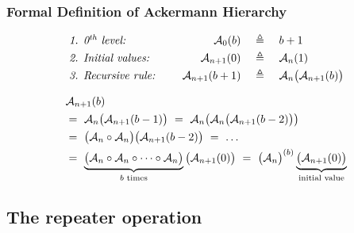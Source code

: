 \begin{frame}
\frametitle{Formal Definition of Ackermann Hierarchy}
\begin{equation*}
\begin{array}{lrcl}
\textit{1. 0$^{\textit{th}}$ level: } & \mathcal{A}_0(b) & ~ \triangleq ~ & b + 1 \\[3pt]
\textit{2. Initial values: } & \mathcal{A}_{n+1}(0) & ~ \triangleq ~ & \mathcal{A}_n(1) \\[3pt]
\textit{3. Recursive rule: } \quad & \mathcal{A}_{n+1}(b+1) & ~ \triangleq ~ & \mathcal{A}_n\big(\mathcal{A}_{n+1}(b)\big)
\end{array}
\end{equation*}

\bigskip

\begin{equation*}
\begin{aligned}
& \mathcal{A}_{n+1}(b) \\
& = ~ \mathcal{A}_n\big(\mathcal{A}_{n+1}(b-1)\big) ~ = ~ \mathcal{A}_n\big(\mathcal{A}_n\big(\mathcal{A}_{n+1}(b-2)\big)\big) \\
& = ~ \big(\mathcal{A}_n\circ \mathcal{A}_n\big) \big(\mathcal{A}_{n+1}(b-2)\big) ~ = ~ \ldots \\
& = ~ \underbrace{\big( \mathcal{A}_n\circ \mathcal{A}_n\circ \cdots \circ \mathcal{A}_n \big)}_{b \text{ times}} \big(\mathcal{A}_{n+1}(0)\big)  ~ = ~ \big(\mathcal{A}_n\big)^{(b)}\underbrace{\big(\mathcal{A}_{n+1}(0)\big)}_{\text{initial value}}
\end{aligned}
\end{equation*}

\end{frame}


\subsection{The repeater operation}


